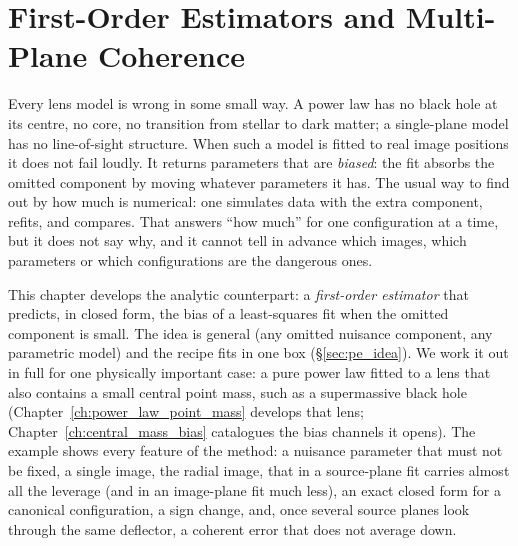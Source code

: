 
\chapter{First-Order Estimators and Multi-Plane Coherence}
\label{ch:perturbative_estimators}

\noindent
Every lens model is wrong in some small way. A power law has no black
hole at its centre, no core, no transition from stellar to dark matter;
a single-plane model has no line-of-sight structure. When such a model
is fitted to real image positions it does not fail loudly. It returns
parameters that are \emph{biased}: the fit absorbs the omitted component
by moving whatever parameters it has. The usual way to find out by how
much is numerical: one simulates data with the extra component, refits,
and compares. That answers ``how much'' for one configuration at a time,
but it does not say why, and it cannot tell in advance which
images, which parameters or which configurations are the dangerous ones.

This chapter develops the analytic counterpart: a \emph{first-order
estimator} that predicts, in closed form, the bias of a least-squares
fit when the omitted component is small. The idea is general (any
omitted nuisance component, any parametric model) and the recipe fits
in one box (\S\ref{sec:pe_idea}). We work it out in full for one
physically important case: a pure power law fitted to a lens that also
contains a small central point mass, such as a supermassive black hole
(Chapter~\ref{ch:power_law_point_mass} develops that lens;
Chapter~\ref{ch:central_mass_bias} catalogues the bias channels it
opens). The example shows every feature of the method: a nuisance
parameter that must not be fixed, a single image, the radial image,
that in a source-plane fit carries almost all the leverage (and in
an image-plane fit much less), an exact closed form for a
canonical configuration, a sign change, and, once several source planes
look through the same deflector, a coherent error that does not
average down.

